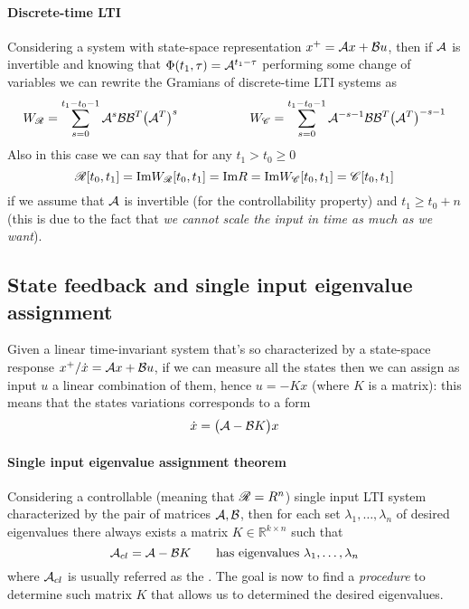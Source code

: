 		\paragraph{Discrete-time LTI} Considering a system with state-space representation $x^+ = \mathcal{A} x + \mathcal{B} u$, then if $\mathcal{A}$ is invertible and knowing that $\Phi(t_1,\tau) = \mathcal{A}^{t_1-\tau}$ performing some change of variables we can rewrite the Gramians of discrete-time LTI systems as
		\[ W_\mathscr R = \sum_{s=0}^{t_1-t_0-1} \mathcal{A}^s \mathcal{B} \mathcal{B}^T \big(\mathcal{A}^T\big)^s \hspace{2cm} W_\mathscr C = \sum_{s=0}^{t_1-t_0-1} \mathcal{A}^{-s-1} \mathcal{B} \mathcal{B}^T \big(\mathcal{A}^T\big)^{-s-1} \]
		Also in this case we can say that for any $t_1 > t_0 \geq 0$ 
		\[ \mathscr R [t_0,t_1] = \textrm{Im} W_\mathscr R[t_0,t_1] = \textrm{Im} R = \textrm{Im} W_\mathscr C[t_0,t_1] = \mathscr C[t_0,t_1] \]
		if we assume that $\mathcal{A}$ is invertible (for the controllability property) and $t_1 \geq t_0 +n $ (this is due to the fact that \textit{we cannot scale the input in time as much as we want}).
	
	\subsection{State feedback and single input eigenvalue assignment}
		Given a linear time-invariant system that's so characterized by a state-space response $x^+/\dot x = \mathcal{A} x + \mathcal{B} u$, if we can measure all the states then we can assign as input $u$ a linear combination of them, hence $u = - K x$ (where $K$ is a matrix): this means that the states variations corresponds to a form
		\[ \dot x = \big(\mathcal{A}- \mathcal{B} K\big) x \]
		
		\paragraph{Single input eigenvalue assignment theorem} Considering a controllable (meaning that $\mathscr R = R^n$) single input LTI system characterized by the pair of matrices $\mathcal{A},\mathcal{B}$, then for each set $\lambda_1,\dots,\lambda_n$ of desired eigenvalues there always exists a matrix $K \in \mathds R^{k\times n}$ such that
		\begin{equation}
			\mathcal{A}_{cl} = \mathcal{A} - \mathcal{B} K \qquad \textrm{has eigenvalues } \lambda_1,\dots, \lambda_n
		\end{equation}
		where $\mathcal{A}_{cl}$ is usually referred as the . The goal is now to find a \textit{procedure} to determine such matrix $K$ that allows us to determined the desired eigenvalues.
		
